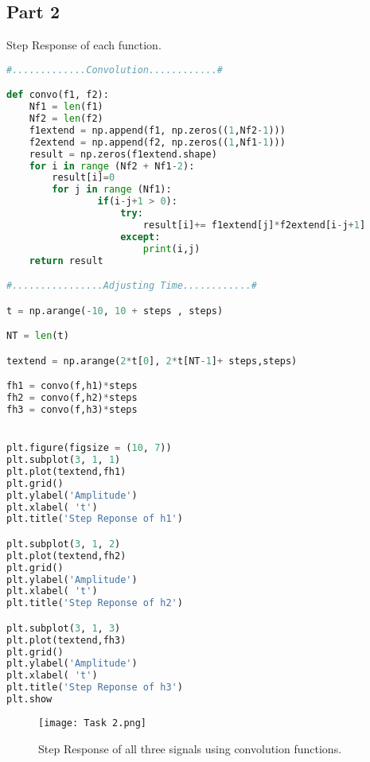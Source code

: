 \documentclass[11pt,a4]{report}
\begin{document}
\subsection{Part 2}
Step Response of each function.
\begin{lstlisting}[language=Python]
#.............Convolution............#

def convo(f1, f2):
    Nf1 = len(f1)
    Nf2 = len(f2)
    f1extend = np.append(f1, np.zeros((1,Nf2-1)))
    f2extend = np.append(f2, np.zeros((1,Nf1-1)))
    result = np.zeros(f1extend.shape)
    for i in range (Nf2 + Nf1-2):
        result[i]=0
        for j in range (Nf1):
                if(i-j+1 > 0):
                    try:
                        result[i]+= f1extend[j]*f2extend[i-j+1]
                    except:
                        print(i,j)
    return result

#................Adjusting Time............#

t = np.arange(-10, 10 + steps , steps)

NT = len(t)

textend = np.arange(2*t[0], 2*t[NT-1]+ steps,steps)

fh1 = convo(f,h1)*steps
fh2 = convo(f,h2)*steps
fh3 = convo(f,h3)*steps


plt.figure(figsize = (10, 7))
plt.subplot(3, 1, 1)
plt.plot(textend,fh1)
plt.grid()
plt.ylabel('Amplitude')
plt.xlabel( 't')
plt.title('Step Reponse of h1')

plt.subplot(3, 1, 2)
plt.plot(textend,fh2)
plt.grid()
plt.ylabel('Amplitude')
plt.xlabel( 't')
plt.title('Step Reponse of h2')

plt.subplot(3, 1, 3)
plt.plot(textend,fh3)
plt.grid()
plt.ylabel('Amplitude')
plt.xlabel( 't')
plt.title('Step Reponse of h3')
plt.show
\end{lstlisting}

\begin{figure}[h!]
    \begin{center}
  \caption{Step Response of all three signals using convolution functions. }
  \texttt{[image: Task 2.png]}
\end{center}
\end{figure}
\end{document}
